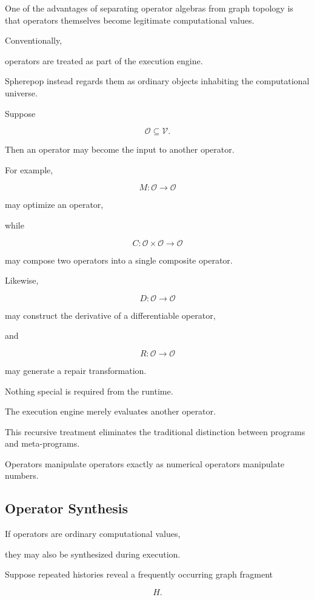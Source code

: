 \documentclass[12pt,oneside]{article}
\begin{document}
One of the advantages of separating operator algebras from graph topology is that operators themselves become legitimate computational values.

Conventionally,

operators are treated as part of the execution engine.

Spherepop instead regards them as ordinary objects inhabiting the computational universe.

Suppose

\[
\mathcal O
\subseteq
\mathcal V.
\]

Then an operator may become the input to another operator.

For example,

\[
M:
\mathcal O
\rightarrow
\mathcal O
\]

may optimize an operator,

while

\[
C:
\mathcal O\times\mathcal O
\rightarrow
\mathcal O
\]

may compose two operators into a single composite operator.

Likewise,

\[
D:
\mathcal O
\rightarrow
\mathcal O
\]

may construct the derivative of a differentiable operator,

and

\[
R:
\mathcal O
\rightarrow
\mathcal O
\]

may generate a repair transformation.

Nothing special is required from the runtime.

The execution engine merely evaluates another operator.

This recursive treatment eliminates the traditional distinction between programs and meta-programs.

Operators manipulate operators exactly as numerical operators manipulate numbers.

\subsection{Operator Synthesis}

If operators are ordinary computational values,

they may also be synthesized during execution.

Suppose repeated histories reveal a frequently occurring graph fragment

\[
H.
\]
\end{document}
